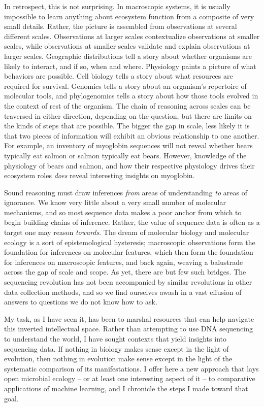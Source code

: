 In retrospect, this is not surprising. In macroscopic systems, it is usually impossible to learn anything about ecosystem function from a composite of very small details. Rather, the picture is assembled from observations at several different scales. Observations at larger scales contextualize observations at smaller scales, while observations at smaller scales validate and explain observations at larger scales. Geographic distributions tell a story about whether organisms are likely to interact, and if so, when and where. Physiology paints a picture of what behaviors are possible. Cell biology tells a story about what resources are required for survival. Genomics tells a story about an organism's repertoire of molecular tools, and phylogenomics tells a story about how those tools evolved in the context of rest of the organism. The chain of reasoning across scales can be traversed in either direction, depending on the question, but there are limits on the kinds of steps that are possible. The bigger the gap in scale, less likely it is that two pieces of information will exhibit an obvious relationship to one another. For example, an inventory of myoglobin sequences will not reveal whether bears typically eat salmon or salmon typically eat bears. However, knowledge of the physiology of bears and salmon, and how their respective physiology drives their ecosystem roles {\em does} reveal interesting insights on myoglobin.

Sound reasoning must draw inferences {\em from} areas of understanding {\em to} areas of ignorance. We know very little about a very small number of molecular mechanisms, and so most sequence data makes a poor anchor from which to begin building chains of inference. Rather, the value of sequence data is often as a target one may reason {\em towards}. The dream of molecular biology and molecular ecology is a sort of epistemological hysteresis; macroscopic observations form the foundation for inferences on molecular features, which then form the foundation for inferences on macroscopic features, and back again, weaving a balustrade across the gap of scale and scope. As yet, there are but few such bridges. The sequencing revolution has not been accompanied by similar revolutions in other data collection methods, and so we find ourselves awash in a vast effusion of answers to questions we do not know how to ask.

My task, as I have seen it, has been to marshal resources that can help navigate this inverted intellectual space. Rather than attempting to use DNA sequencing to understand the world, I have sought contexts that yield insights into sequencing data. If nothing in biology makes sense except in the light of evolution, then nothing in evolution make sense except in the light of the systematic comparison of its manifestations. I offer here a new approach that lays open microbial ecology -- or at least one interesting aspect of it -- to comparative applications of machine learning, and I chronicle the steps I made toward that goal.

